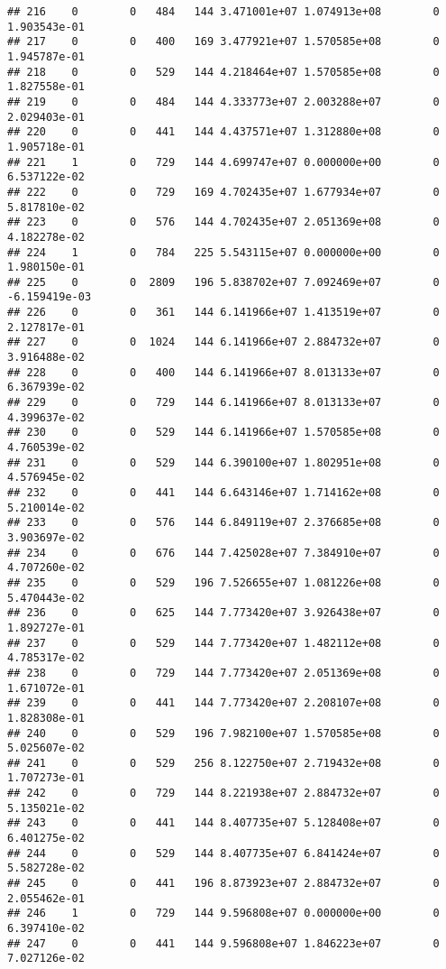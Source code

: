 \documentclass[
]{article}
\begin{document}
\begin{enumerate}
\begin{verbatim}
## 216    0        0   484   144 3.471001e+07 1.074913e+08        0  1.903543e-01
## 217    0        0   400   169 3.477921e+07 1.570585e+08        0  1.945787e-01
## 218    0        0   529   144 4.218464e+07 1.570585e+08        0  1.827558e-01
## 219    0        0   484   144 4.333773e+07 2.003288e+07        0  2.029403e-01
## 220    0        0   441   144 4.437571e+07 1.312880e+08        0  1.905718e-01
## 221    1        0   729   144 4.699747e+07 0.000000e+00        0  6.537122e-02
## 222    0        0   729   169 4.702435e+07 1.677934e+07        0  5.817810e-02
## 223    0        0   576   144 4.702435e+07 2.051369e+08        0  4.182278e-02
## 224    1        0   784   225 5.543115e+07 0.000000e+00        0  1.980150e-01
## 225    0        0  2809   196 5.838702e+07 7.092469e+07        0 -6.159419e-03
## 226    0        0   361   144 6.141966e+07 1.413519e+07        0  2.127817e-01
## 227    0        0  1024   144 6.141966e+07 2.884732e+07        0  3.916488e-02
## 228    0        0   400   144 6.141966e+07 8.013133e+07        0  6.367939e-02
## 229    0        0   729   144 6.141966e+07 8.013133e+07        0  4.399637e-02
## 230    0        0   529   144 6.141966e+07 1.570585e+08        0  4.760539e-02
## 231    0        0   529   144 6.390100e+07 1.802951e+08        0  4.576945e-02
## 232    0        0   441   144 6.643146e+07 1.714162e+08        0  5.210014e-02
## 233    0        0   576   144 6.849119e+07 2.376685e+08        0  3.903697e-02
## 234    0        0   676   144 7.425028e+07 7.384910e+07        0  4.707260e-02
## 235    0        0   529   196 7.526655e+07 1.081226e+08        0  5.470443e-02
## 236    0        0   625   144 7.773420e+07 3.926438e+07        0  1.892727e-01
## 237    0        0   529   144 7.773420e+07 1.482112e+08        0  4.785317e-02
## 238    0        0   729   144 7.773420e+07 2.051369e+08        0  1.671072e-01
## 239    0        0   441   144 7.773420e+07 2.208107e+08        0  1.828308e-01
## 240    0        0   529   196 7.982100e+07 1.570585e+08        0  5.025607e-02
## 241    0        0   529   256 8.122750e+07 2.719432e+08        0  1.707273e-01
## 242    0        0   729   144 8.221938e+07 2.884732e+07        0  5.135021e-02
## 243    0        0   441   144 8.407735e+07 5.128408e+07        0  6.401275e-02
## 244    0        0   529   144 8.407735e+07 6.841424e+07        0  5.582728e-02
## 245    0        0   441   196 8.873923e+07 2.884732e+07        0  2.055462e-01
## 246    1        0   729   144 9.596808e+07 0.000000e+00        0  6.397410e-02
## 247    0        0   441   144 9.596808e+07 1.846223e+07        0  7.027126e-02

\end{verbatim}
\end{enumerate}
\end{document}
